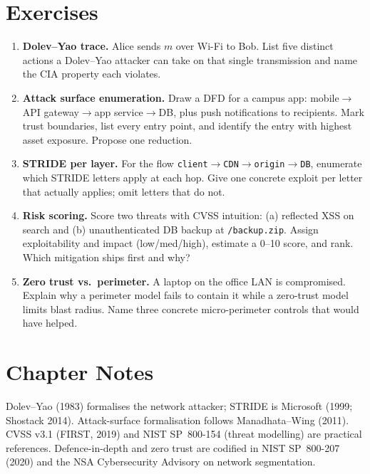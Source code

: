 \section{Exercises}\label{sec:ch01-exercises}
\begin{enumerate}[label=E1.\arabic*, leftmargin=*, itemsep=0.6em]
    \item \textbf{Dolev--Yao trace.} Alice sends $m$ over Wi-Fi to Bob. List five
    distinct actions a Dolev--Yao attacker can take on that single transmission
    and name the CIA property each violates.
    \item \textbf{Attack surface enumeration.} Draw a DFD for a campus app:
    mobile$\to$API gateway$\to$app service$\to$DB, plus push notifications to
    recipients. Mark trust boundaries, list every entry point, and identify the
    entry with highest asset exposure. Propose one reduction.
    \item \textbf{STRIDE per layer.} For the flow \texttt{client}$\to$\texttt{CDN}$\to$\texttt{origin}$\to$\texttt{DB},
    enumerate which STRIDE letters apply at each hop. Give one concrete exploit
    per letter that actually applies; omit letters that do not.
    \item \textbf{Risk scoring.} Score two threats with CVSS intuition: (a) reflected
    XSS on search and (b) unauthenticated DB backup at \texttt{/backup.zip}.
    Assign exploitability and impact (low/med/high), estimate a 0--10 score, and
    rank. Which mitigation ships first and why?
    \item \textbf{Zero trust vs.\ perimeter.} A laptop on the office LAN is
    compromised. Explain why a perimeter model fails to contain it while a
    zero-trust model limits blast radius. Name three concrete micro-perimeter
    controls that would have helped.
\end{enumerate}

\section*{Chapter Notes}
Dolev--Yao (1983) formalises the network attacker; STRIDE is Microsoft (1999;
Shostack 2014). Attack-surface formalisation follows Manadhata--Wing (2011).
CVSS v3.1 (FIRST, 2019) and NIST SP~800-154 (threat modelling) are practical
references. Defence-in-depth and zero trust are codified in NIST SP~800-207
(2020) and the NSA Cybersecurity Advisory on network segmentation.
